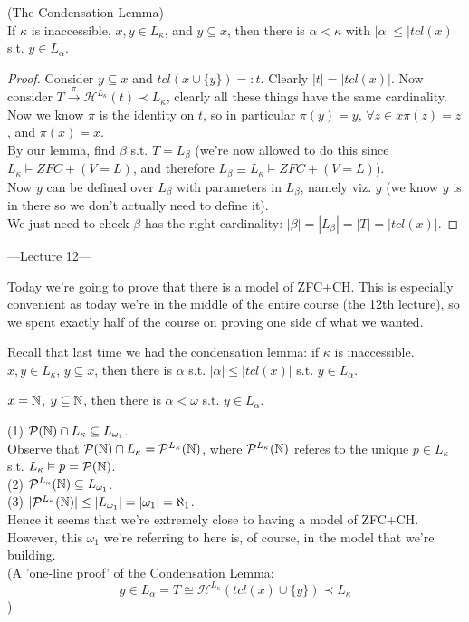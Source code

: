 \documentclass[a4paper]{article}
\begin{document}
\begin{thm} (The Condensation Lemma)\\
If $\kappa$ is inaccessible, $x,y \in L_\kappa$, and $y \subseteq x$, then there is $\alpha < \kappa$ with $|\alpha| \leq |tcl(x)|$ s.t. $y \in L_\alpha$.
\begin{proof}
Consider $y\subseteq x$ and $tcl(x \cup \{y\}) =: t$. Clearly $|t| = |tcl(x)|$. Now consider $T \xrightarrow{\pi} \mathcal{H}^{L_\kappa} (t) \prec L_\kappa$, clearly all these things have the same cardinality. Now we know $\pi$ is the identity on $t$, so in particular $\pi(y) = y$, $\forall z \in x \pi(z)=z$, and $\pi(x) = x$.\\
By our lemma, find $\beta$ s.t. $T=L_\beta$ (we're now allowed to do this since $L_\kappa \vDash ZFC+(V=L)$, and therefore $L_\beta \equiv L_\kappa \vDash ZFC+(V=L)$).\\
Now $y$ can be defined over $L_\beta$ with parameters in $L_\beta$, namely viz. $y$ (we know $y$ is in there so we don't actually need to define it).\\
We just need to check $\beta$ has the right cardinality: $|\beta| = |L_\beta| = |T| = |tcl(x)|$.
\end{proof}
\end{thm}

---Lecture 12---

Today we're going to prove that there is a model of ZFC+CH. This is especially convenient as today we're in the middle of the entire course (the 12th lecture), so we spent exactly half of the course on proving one side of what we wanted.

Recall that last time we had the condensation lemma: if $\kappa$ is inaccessible. $x,y \in L_\kappa$, $y \subseteq x$, then there is $\alpha$ s.t. $|\alpha| \leq |tcl(x)|$ s.t. $y \in L_\alpha$.

\begin{coro}
$x=\mathbb{N}$, $y \subseteq \mathbb{N}$, then there is $\alpha < \omega$ s.t. $y \in L_\alpha$.
\end{coro}

\begin{coro}
(1) $\mathcal{P}(\mathbb{N}) \cap L_\kappa \subseteq L_{\omega_1}$.\\
Observe that $\mathcal{P}(\mathbb{N}) \cap L_\kappa = \mathcal{P}^{L_\kappa}(\mathbb{N})$, where $\mathcal{P}^{L_\kappa}(\mathbb{N})$ referes to the unique $p \in L_\kappa$ s.t. $L_\kappa \vDash p=\mathcal{P}(\mathbb{N})$.\\
(2) $\mathcal{P}^{L_\kappa}(\mathbb{N}) \subseteq L_{\omega_1}$.\\
(3) $|\mathcal{P}^{L_\kappa}(\mathbb{N})| \leq |L_{\omega_1}| = |\omega_1| = \aleph_1$.\\
Hence it seems that we're extremely close to having a model of ZFC+CH. However, this $\omega_1$ we're referring to here is, of course, in the model that we're building.\\
(A 'one-line proof' of the Condensation Lemma:
\[
y \in L_\alpha = T \cong \mathcal{H}^{L_\kappa} (tcl(x)\cup\{y\}) \prec L_\kappa
\]
)
\end{coro}
\end{document}

